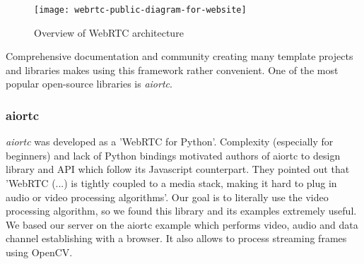\documentclass[../Main.tex]{subfiles}
\begin{document}
    \begin{figure}[h]
    \centering
    \texttt{[image: webrtc-public-diagram-for-website]}
    \caption{Overview of WebRTC architecture}
    \end{figure}

    Comprehensive documentation and community creating many template projects and libraries makes using this framework rather convenient. One of the most popular open-source libraries is \textit{aiortc}.
    
    
    \subsubsection{aiortc}
    \textit{aiortc} was developed as a 'WebRTC for Python'. Complexity (especially for beginners) and lack of Python bindings motivated authors of aiortc to design library and API which follow its Javascript counterpart. They pointed out that  'WebRTC (...) is tightly coupled to a media stack, making it hard to plug in audio or video processing algorithms'. Our goal is to literally use the video processing algorithm, so we found this library and its examples extremely useful.
    We based our server on the aiortc example which performs video, audio and data channel establishing with a browser. It also allows to process streaming frames using OpenCV. 
    
\end{document}
